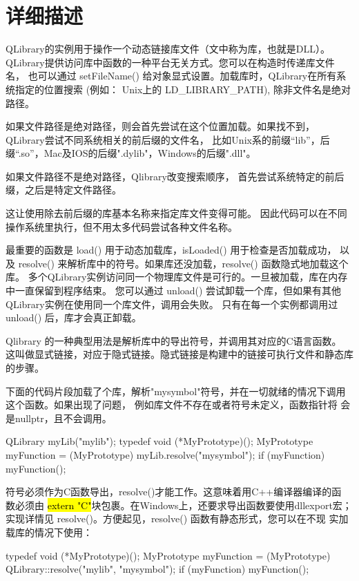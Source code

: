 \section{详细描述}

QLibrary的实例用于操作一个动态链接库文件（文中称为库，也就是DLL）。
QLibrary提供访问库中函数的一种平台无关方式。您可以在构造时传递库文件名，
也可以通过 setFileName() 给对象显式设置。加载库时，QLibrary在所有系统指定的位置搜索 (例如： Unix上的 LD\_LIBRARY\_PATH), 除非文件名是绝对路径。

如果文件路径是绝对路径，则会首先尝试在这个位置加载。如果找不到，
QLibrary尝试不同系统相关的前后缀的文件名，
比如Unix系的前缀“lib”，后缀“.so”，Mac及IOS的后缀".dylib"，Windows的后缀".dll"。

如果文件路径不是绝对路径，Qlibrary改变搜索顺序，
首先尝试系统特定的前后缀，之后是特定文件路径。

这让使用除去前后缀的库基本名称来指定库文件变得可能。
因此代码可以在不同操作系统里执行，但不用太多代码尝试各种文件名称。

最重要的函数是 load() 用于动态加载库，isLoaded() 用于检查是否加载成功，
以及 resolve() 来解析库中的符号。如果库还没加载，resolve() 函数隐式地加载这个库。
多个QLibrary实例访问同一个物理库文件是可行的。一旦被加载，库在内存中一直保留到程序结束。
您可以通过 unload() 尝试卸载一个库，但如果有其他QLibrary实例在使用同一个库文件，调用会失败。
只有在每一个实例都调用过 unload() 后，库才会真正卸载。

Qlibrary 的一种典型用法是解析库中的导出符号，并调用其对应的C语言函数。
这叫做显式链接，对应于隐式链接。隐式链接是构建中的链接可执行文件和静态库的步骤。

下面的代码片段加载了个库，解析"mysymbol"符号，并在一切就绪的情况下调用
这个函数。如果出现了问题， 例如库文件不存在或者符号未定义，函数指针将
会是nullptr，且不会调用。

\begin{cppcode}
QLibrary myLib("mylib");
typedef void (*MyPrototype)();
MyPrototype myFunction = (MyPrototype) myLib.resolve("mysymbol");
if (myFunction)
    myFunction();
\end{cppcode}

符号必须作为C函数导出，resolve()才能工作。这意味着用C++编译器编译的函
数必须由 \hl{extern "C"}块包裹。在Windows上，还要求导出函数要使用dllexport宏；
实现详情见 resolve()。方便起见，resolve() 函数有静态形式，您可以在不现
实加载库的情况下使用：


\begin{cppcode}
typedef void (*MyPrototype)();
MyPrototype myFunction =
        (MyPrototype) QLibrary::resolve("mylib", "mysymbol");
if (myFunction)
    myFunction();
\end{cppcode}

